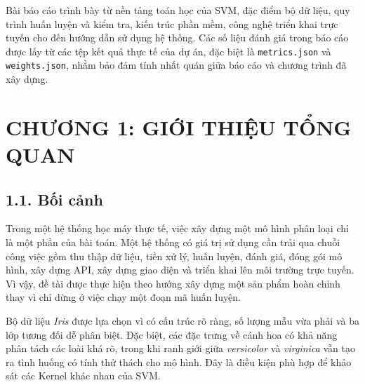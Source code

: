 \documentclass{article}
\begin{document}
	Bài báo cáo trình bày từ nền tảng toán học của SVM, đặc điểm bộ dữ liệu, quy trình huấn luyện và kiểm tra, kiến trúc phần mềm, công nghệ triển khai trực tuyến cho đến hướng dẫn sử dụng hệ thống. Các số liệu đánh giá trong báo cáo được lấy từ các tệp kết quả thực tế của dự án, đặc biệt là \texttt{metrics.json} và \texttt{weights.json}, nhằm bảo đảm tính nhất quán giữa báo cáo và chương trình đã xây dựng.
	
	
	\newpage
	\section{\centering CHƯƠNG 1: GIỚI THIỆU TỔNG QUAN}
	\subsection{1.1. Bối cảnh}
	\hspace{0.5cm}
	Trong một hệ thống học máy thực tế, việc xây dựng một mô hình phân loại chỉ là một phần của bài toán. Một hệ thống có giá trị sử dụng cần trải qua chuỗi công việc gồm thu thập dữ liệu, tiền xử lý, huấn luyện, đánh giá, đóng gói mô hình, xây dựng API, xây dựng giao diện và triển khai lên môi trường trực tuyến. Vì vậy, đề tài được thực hiện theo hướng xây dựng một sản phẩm hoàn chỉnh thay vì chỉ dừng ở việc chạy một đoạn mã huấn luyện.
	
	Bộ dữ liệu \textit{Iris} được lựa chọn vì có cấu trúc rõ ràng, số lượng mẫu vừa phải và ba lớp tương đối dễ phân biệt. Đặc biệt, các đặc trưng về cánh hoa có khả năng phân tách các loài khá rõ, trong khi ranh giới giữa \textit{versicolor} và \textit{virginica} vẫn tạo ra tình huống có tính thử thách cho mô hình. Đây là điều kiện phù hợp để khảo sát các Kernel khác nhau của SVM.
	
\end{document}
